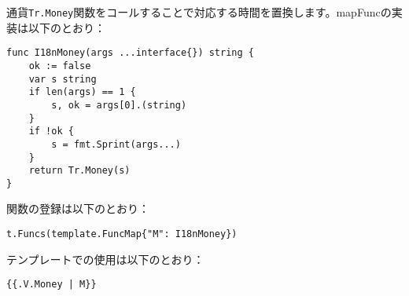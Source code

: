 \begin{enumerate}
通貨\texttt{Tr.Money}関数をコールすることで対応する時間を置換します。mapFuncの実装は以下のとおり：
  \begin{lstlisting}[numbers=none]
func I18nMoney(args ...interface{}) string {
    ok := false
    var s string
    if len(args) == 1 {
        s, ok = args[0].(string)
    }
    if !ok {
        s = fmt.Sprint(args...)
    }
    return Tr.Money(s)
}
  \end{lstlisting}
関数の登録は以下のとおり：
  \begin{lstlisting}[numbers=none]
t.Funcs(template.FuncMap{"M": I18nMoney})
  \end{lstlisting}
テンプレートでの使用は以下のとおり：
  \begin{lstlisting}[numbers=none]
{{.V.Money | M}}
  \end{lstlisting}
\end{enumerate}

